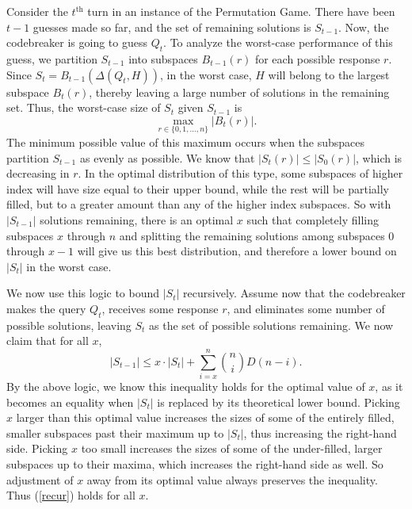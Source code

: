 \documentclass[12pt, a4paper]{article}
\newcommand{\nth}{^{\text{th}}}       %
\begin{document}
		 Consider the $t\nth$ turn in an instance of the Permutation Game. There have been $t-1$ guesses made so far, and the set of remaining solutions is $S_{t-1}$. Now, the codebreaker is going to guess $Q_t$. To analyze the worst-case performance of this guess, we partition $S_{t-1}$ into subspaces $ B_{t-1}(r)$ for each possible response $r$. Since $S_t = B_{t-1}(\Delta(Q_t,H))$, in the worst case, $H$ will belong to the largest subspace $B_t(r)$, thereby leaving a large number of solutions in the remaining set. Thus, the worst-case size of $S_t$ given $S_{t-1}$ is
		 \begin{equation*}
			\max_{r\in\{0,1,\ldots,n\}}|B_{t}(r)|.
		 \end{equation*}
		 The minimum possible value of this maximum occurs when the subspaces partition $S_{t-1}$ as evenly as possible. We know that $|S_t(r)| \leq |S_0(r)|$, which is decreasing in $r$. In the optimal distribution of this type, some subspaces of higher index will have size equal to their upper bound, while the rest will be partially filled, but to a greater amount than any of the higher index subspaces. So with $|S_{t-1}|$ solutions remaining, there is an optimal $x$ such that completely filling subspaces $x$ through $n$ and splitting the remaining solutions among subspaces 0 through $x-1$ will give us this best distribution, and therefore a lower bound on $|S_t|$ in the worst case.
		 
		We now use this logic to bound $|S_t|$ recursively. Assume now that the codebreaker makes the query $Q_t$, receives some response $r$, and eliminates some number of possible solutions, leaving $S_t$ as the set of possible solutions remaining. We now claim that for all $x$,
		\begin{equation*}
			|S_{t-1}|\le  x\cdot |S_t| + \sum_{i = x}^{n}\binom{n}{i}D(n-i).
		\end{equation*}
		By the above logic, we know this inequality holds for the optimal value of $x$, as it becomes an equality when $|S_t|$ is replaced by its theoretical lower bound. Picking $x$ larger than this optimal value increases the sizes of some of the entirely filled, smaller subspaces past their maximum up to $|S_t|$, thus increasing the right-hand side. Picking $x$ too small increases the sizes of some of the under-filled, larger subspaces up to their maxima, which increases the right-hand side as well. So adjustment of $x$ away from its optimal value always preserves the inequality. Thus (\ref{recur}) holds for all $x$.
		
\end{document}
